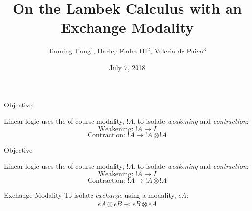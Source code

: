 \documentclass{beamer}
\title{On the Lambek Calculus with an Exchange Modality}
\subtitle{}
\date{July 7, 2018}
\author{Jiaming Jiang$^1$, Harley Eades III$^2$, Valeria de Paiva$^3$}
\institute{$^1$North Carolina State University; $^2$Augusta University; $^3$Nuance Communications}
\begin{document}
\maketitle



\begin{frame}{Objective}

Linear logic uses the of-course modality, $!A$, to isolate
\textit{weakening} and \textit{contraction}:
$$\mbox{Weakening: }!A \rightarrow I$$
$$\mbox{Contraction: }!A \rightarrow !A \otimes !A$$


\end{frame}


\begin{frame}{Objective}

Linear logic uses the of-course modality, $!A$, to isolate
\textit{weakening} and \textit{contraction}:
$$\mbox{Weakening: }!A \rightarrow I$$
$$\mbox{Contraction: }!A \rightarrow !A \otimes !A$$

\begin{block}{Exchange Modality}
To isolate \textit{exchange} using a modality, $eA$:
\begin{gather*}
eA\otimes eB\multimap eB\otimes eA
\end{gather*}
\end{block}

\end{frame}
\end{document}
